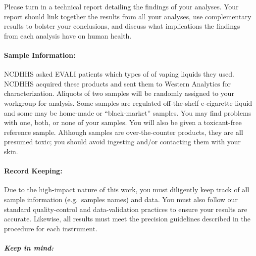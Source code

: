 \documentclass[]{tufte-book}
\begin{document}
Please turn in a technical report detailing the findings of your analyses. Your report should link together the results from all your analyses, use complementary results to bolster your conclusions, and discuss what implications the findings from each analysis have on human health.

\hypertarget{sample-information}{%
\paragraph{\texorpdfstring{\textbf{Sample Information:}}{Sample Information:}}\label{sample-information}}

NCDHHS asked EVALI patients which types of of vaping liquids they used. NCDHHS acquired these products and sent them to Western Analytics for characterization. Aliquots of two samples will be randomly assigned to your workgroup for analysis. Some samples are regulated off-the-shelf e-cigarette liquid and some may be home-made or ``black-market'' samples. You may find problems with one, both, or none of your samples. You will also be given a toxicant-free reference sample. Although samples are over-the-counter products, they are all presumed toxic; you should avoid ingesting and/or contacting them with your skin.

\hypertarget{record-keeping}{%
\paragraph{\texorpdfstring{\textbf{Record Keeping:}}{Record Keeping:}}\label{record-keeping}}

Due to the high-impact nature of this work, you must diligently keep track of all sample information (e.g.~samples names) and data. You must also follow our standard quality-control and data-validation practices to ensure your results are accurate. Likewise, all results must meet the precision guidelines described in the procedure for each instrument.

\hypertarget{keep-in-mind}{%
\paragraph{\texorpdfstring{\emph{Keep in mind:}}{Keep in mind:}}\label{keep-in-mind}}
\end{document}
